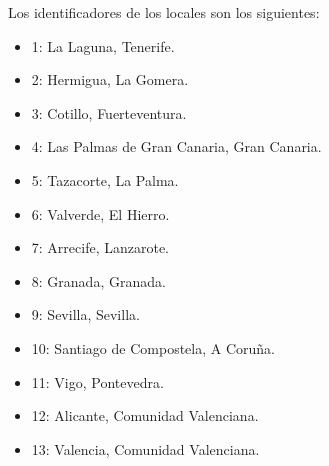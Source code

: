 \documentclass[11pt]{opticajnl}
\begin{document}
\noindent Los identificadores de los locales son los siguientes:
\begin{multicols}{2}
\begin{itemize}
\item 1: La Laguna, Tenerife.
\item 2: Hermigua, La Gomera.
\item 3: Cotillo, Fuerteventura.
\item 4: Las Palmas de Gran Canaria, Gran Canaria.
\item 5: Tazacorte, La Palma.
\item 6: Valverde, El Hierro.
\item 7: Arrecife, Lanzarote.
\item 8: Granada, Granada.
\item 9: Sevilla, Sevilla.
\item 10: Santiago de Compostela, A Coruña.
\item 11: Vigo, Pontevedra.
\item 12: Alicante, Comunidad Valenciana.
\item 13: Valencia, Comunidad Valenciana. 
\end{itemize}
\end{multicols}
\end{document}
